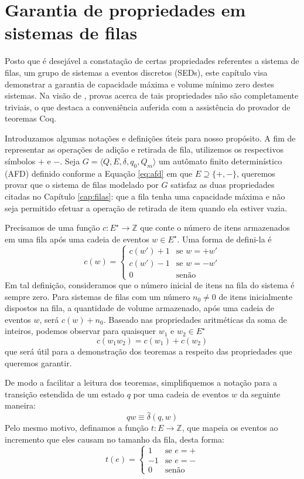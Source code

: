 \chapter{Garantia de propriedades em sistemas de filas}
\label{cap:propriedades}

Posto que é desejável a constatação de certas propriedades referentes a sistema de filas, um grupo de sistemas a eventos discretos (SEDs), este capítulo visa demonstrar a garantia de capacidade máxima e volume mínimo zero destes sistemas. Na visão de , provas acerca de tais propriedades não são completamente triviais, o que destaca a conveniência auferida com a assistência do provador de teoremas Coq.

Introduzamos algumas notações e definições úteis para nosso propósito. A fim de representar as operações de adição e retirada de fila, utilizemos os respectivos símbolos $+$ e $-$. Seja $G = \langle Q, E, \delta, q_0, Q_m \rangle$ um autômato finito determinístico (AFD) definido conforme a Equação \ref{eq:afd} em que $E \supseteq \{ +, - \}$, queremos provar que o sistema de filas modelado por $G$ satisfaz as duas propriedades citadas no Capítulo \ref{cap:filas}: que a fila tenha uma capacidade máxima e não seja permitido efetuar a operação de retirada de item quando ela estiver vazia.

Precisamos de uma função $c : E^\star \to \mathbb{Z}$ que conte o número de itens armazenados em uma fila após uma cadeia de eventos $w \in E^\star$. Uma forma de defini-la é $$c(w) = \begin{cases}
c(w') + 1 & \text{se $w=+w'$}\\
c(w') - 1 & \text{se $w=-w'$}\\
0 & \text{senão}
\end{cases}$$ Em tal definição, consideramos que o número inicial de itens na fila do sistema é sempre zero. Para sistemas de filas com um número $n_0 \neq 0$ de itens inicialmente dispostos na fila, a quantidade de volume armazenado, após uma cadeia de eventos $w$, será $c(w) + n_0$. Baseado nas propriedades aritméticas da soma de inteiros, podemos observar para quaisquer $w_1$ e $w_2 \in E^\star$ $$c(w_1w_2) = c(w_1) + c(w_2)$$ que será útil para a demonstração dos teoremas a respeito das propriedades que queremos garantir.

De modo a facilitar a leitura dos teoremas, simplifiquemos a notação para a transição estendida de um estado $q$ por uma cadeia de eventos $w$ da seguinte maneira: $$qw \equiv \hat{\delta}(q,w)$$ Pelo mesmo motivo, definamos a função $t : E \to \mathbb{Z}$, que mapeia os eventos ao incremento que eles causam no tamanho da fila, desta forma: $$t(e) = \begin{cases}
1 & \text{se $e=+$} \\
-1 & \text{se $e=-$} \\
0 & \text{senão}
\end{cases}$$


